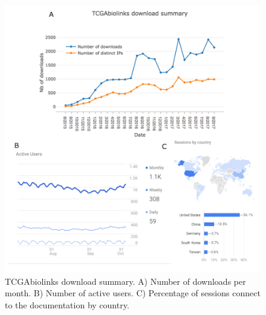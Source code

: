 \begin{figure}
	\centering
	\includegraphics[width=0.7\linewidth]{images/tcgabiolinks_download.pdf}
	\caption[TCGAbiolinks download summary]{TCGAbiolinks download summary. A) Number of downloads per month. B) Number of active users. C) Percentage of sessions connect to the documentation by country.}
	\label{fig:tcgabiolinksdownload}
\end{figure}
